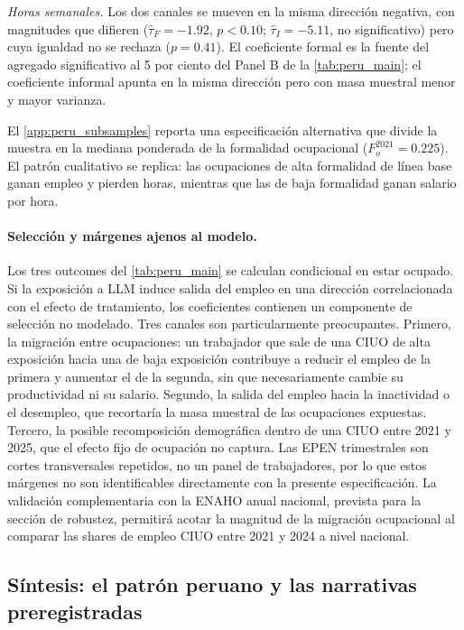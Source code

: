 \emph{Horas semanales.} Los dos canales se mueven en la misma direcci\'{o}n negativa, con magnitudes que difieren ($\hat\tau_F = -1.92$, $p < 0.10$; $\hat\tau_I = -5.11$, no significativo) pero cuya igualdad no se rechaza ($p = 0.41$). El coeficiente formal es la fuente del agregado significativo al 5 por ciento del Panel B de la \cref{tab:peru_main}; el coeficiente informal apunta en la misma direcci\'{o}n pero con masa muestral menor y mayor varianza.

El \cref{app:peru_subsamples} reporta una especificaci\'{o}n alternativa que divide la muestra en la mediana ponderada de la formalidad ocupacional ($F_o^{2021} = 0.225$). El patr\'{o}n cualitativo se replica: las ocupaciones de alta formalidad de l\'{i}nea base ganan empleo y pierden horas, mientras que las de baja formalidad ganan salario por hora.

\paragraph{Selecci\'{o}n y m\'{a}rgenes ajenos al modelo.} Los tres outcomes del \cref{tab:peru_main} se calculan condicional en estar ocupado. Si la exposici\'{o}n a LLM induce salida del empleo en una direcci\'{o}n correlacionada con el efecto de tratamiento, los coeficientes contienen un componente de selecci\'{o}n no modelado. Tres canales son particularmente preocupantes. Primero, la migraci\'{o}n entre ocupaciones: un trabajador que sale de una CIUO de alta exposici\'{o}n hacia una de baja exposici\'{o}n contribuye a reducir el empleo de la primera y aumentar el de la segunda, sin que necesariamente cambie su productividad ni su salario. Segundo, la salida del empleo hacia la inactividad o el desempleo, que recortar\'{i}a la masa muestral de las ocupaciones expuestas. Tercero, la posible recomposici\'{o}n demogr\'{a}fica dentro de una CIUO entre 2021 y 2025, que el efecto fijo de ocupaci\'{o}n no captura. Las EPEN trimestrales son cortes transversales repetidos, no un panel de trabajadores, por lo que estos m\'{a}rgenes no son identificables directamente con la presente especificaci\'{o}n. La validaci\'{o}n complementaria con la ENAHO anual nacional, prevista para la secci\'{o}n de robustez, permitir\'{a} acotar la magnitud de la migraci\'{o}n ocupacional al comparar las shares de empleo CIUO entre 2021 y 2024 a nivel nacional.

\subsection{S\'{i}ntesis: el patr\'{o}n peruano y las narrativas preregistradas}
\label{subsec:results_narrative}

